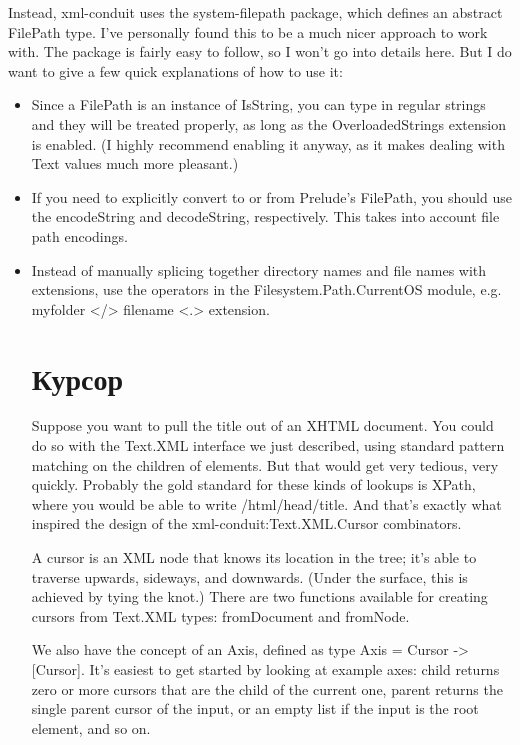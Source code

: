 Instead, xml-conduit uses the system-filepath package, which defines an abstract FilePath type. I've personally found this to be a much nicer approach to work with. The package is fairly easy to follow, so I won't go into details here. But I do want to give a few quick explanations of how to use it:

\begin{itemize}
\item Since a FilePath is an instance of IsString, you can type in regular strings and they will be treated properly, as long as the OverloadedStrings extension is enabled. (I highly recommend enabling it anyway, as it makes dealing with Text values much more pleasant.)
\item If you need to explicitly convert to or from Prelude's FilePath, you should use the encodeString and decodeString, respectively. This takes into account file path encodings.
\item Instead of manually splicing together directory names and file names with extensions, use the operators in the Filesystem.Path.CurrentOS module, e.g. myfolder </> filename <.> extension.
\begin{end}
  
\section{Курсор} %

Suppose you want to pull the title out of an XHTML document. You could do so with the Text.XML interface we just described, using standard pattern matching on the children of elements. But that would get very tedious, very quickly. Probably the gold standard for these kinds of lookups is XPath, where you would be able to write /html/head/title. And that's exactly what inspired the design of the xml-conduit:Text.XML.Cursor combinators.

A cursor is an XML node that knows its location in the tree; it's able to traverse upwards, sideways, and downwards. (Under the surface, this is achieved by tying the knot.) There are two functions available for creating cursors from Text.XML types: fromDocument and fromNode.

We also have the concept of an Axis, defined as type Axis = Cursor -> [Cursor]. It's easiest to get started by looking at example axes: child returns zero or more cursors that are the child of the current one, parent returns the single parent cursor of the input, or an empty list if the input is the root element,
and so on.


\end{end}
\end{itemize}
